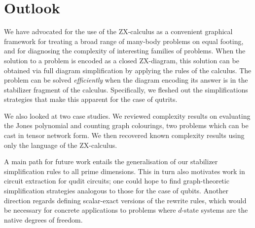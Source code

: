 \section{Outlook}

We have advocated for the use of the ZX-calculus
as a convenient graphical framework for treating a broad range of many-body problems on equal footing, and for diagnosing the complexity of interesting families of problems.
When the solution to a problem is encoded as a closed ZX-diagram,
this solution can be obtained via full diagram simplification by applying the rules of the calculus.
The problem can be solved \emph{efficiently} when the diagram encoding its answer is in the stabilizer fragment of the calculus.
Specifically, we fleshed out the simplifications strategies that make this apparent for the case of qutrits.

We also looked at two case studies.
We reviewed complexity results on evaluating the Jones polynomial and counting graph colourings, two problems which can be cast in tensor network form.
We then recovered known complexity results using only the language of the ZX-calculus.

A main path for future work entails the generalisation
of our stabilizer simplification rules to all prime dimensions.
This in turn also motivates work in circuit extraction \cite{backens2020again} for qudit circuits; one could hope to find graph-theoretic simplification \cite{graph_theoretic_simplification} strategies analogous to those for the case of qubits.
Another direction regards defining scalar-exact versions of the rewrite rules, which would be necessary for concrete applications to problems where $d$-state systems are the native degrees of freedom.
